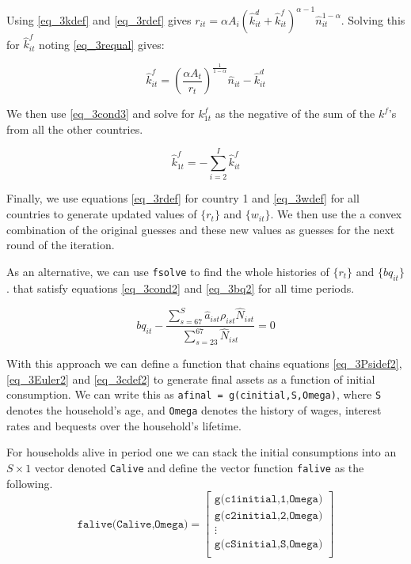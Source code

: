 \documentclass[letterpaper,12pt]{article}
\theoremstyle{definition}
\numberwithin{equation}{section}
\begin{document}
\begin{spacing}{1.5}
	Using \eqref{eq_3kdef} and \eqref{eq_3rdef} gives $r_{it} = \alpha A_i(\hat k^d_{it} + \hat k^f_{it})^{\alpha-1} \hat n_{it}^{1-\alpha}$.  Solving this for $\hat k^f_{it}$ noting \eqref{eq_3requal} gives:

	\begin{equation}
        \hat k^f_{it} = \left(\frac{\alpha A_t}{r_t}\right)^{\frac{1}{1-\alpha}} \hat n_{it} - \hat k^d_{it}
	\end{equation}

	We then use \eqref{eq_3cond3} and solve for $k^f_{1t}$ as the negative of the sum of the $k^f$'s from all the other countries.

	\begin{equation}
		\hat k^f_{1t} = -\sum_{i=2}^I \hat k^f_{it}
	\end{equation}

	Finally, we use equations \eqref{eq_3rdef} for country 1 and \eqref{eq_3wdef} for all countries to generate updated values of $\{r_t\}$ and $\{w_{it}\}$.  We then use the a convex combination of the original guesses and these new values as guesses for the next round of the iteration.

	As an alternative, we can use \texttt{fsolve} to find the whole histories of $\{r_t\}$ and $\{bq_{it}\}$. that satisfy equations \eqref{eq_3cond2} and \eqref{eq_3bq2} for all time periods.

	\begin{equation}
		bq_{it} - \frac{\sum_{s=67}^S \hat a_{ist} \rho_{ist} \hat N_{ist}} {\sum_{s=23}^{67} \hat N_{ist}} = 0 \label{eq_3bq2}
	\end{equation}

	With this approach we can define a function that chains equations \eqref{eq_3Psidef2}, \eqref{eq_3Euler2} and \eqref{eq_3cdef2} to generate final assets as a function of initial consumption.  We can write this as \texttt{afinal = g(cinitial,S,Omega)}, where \texttt{S} denotes the household's age, and \texttt{Omega} denotes the history of wages, interest rates and bequests over the household's lifetime.

	For households alive in period one we can stack the initial consumptions into an $S\times 1$ vector denoted \texttt{Calive} and define the vector function \texttt{falive} as the following.
	\begin{equation}
		\texttt{falive(Calive,Omega)} = 
		\begin{bmatrix}
		\texttt{g(c1initial,1,Omega)} \\
		\texttt{g(c2initial,2,Omega)} \\
		\vdots \\
		\texttt{g(cSinitial,S,Omega)} \\
		\end{bmatrix} \nonumber
	\end{equation}


\end{spacing}
\end{document}
